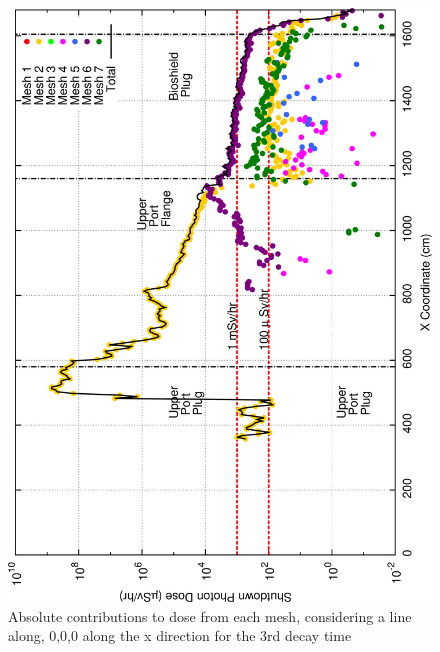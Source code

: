 \documentclass[12pt]{article}
\begin{document}
\begin{figure}[ht!]
\centering
\includegraphics[clip,scale=0.25]{../plots/crosstalk/b4c/up/dc3.png}
\caption{Absolute contributions to dose from each mesh, considering a line along, 0,0,0 along the x direction for the 3rd decay time}
\label{fig:b4c_ct_up_dc3}
\end{figure}
\end{document}

